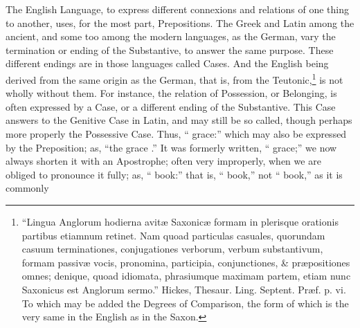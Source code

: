 The English Language, to express different connexions and relations of
one thing to another, uses, for the most part, Prepositions. The Greek
and Latin among the ancient, and some too among the modern languages, as
the German, vary the termination or ending of the Substantive, to answer
the same purpose. These different endings are in those languages called
Cases. And the English being derived from the same origin as the German,
that is, from the Teutonic,\footnote{``Lingua Anglorum hodierna
  avit\ae{} Saxonic\ae{} formam in plerisque orationis partibus etiamnum
  retinet. Nam quoad particulas casuales, quorundam casuum
  terminationes, conjugationes verborum, verbum substantivum, formam
  passiv\ae{} vocis, pronomina, participia, conjunctiones, \&
  pr\ae{}positiones omnes; denique, quoad idiomata, phrasiumque maximam
  partem, etiam nunc Saxonicus est Anglorum sermo.'' Hickes, Thesaur.
  Ling. Septent. Pr\ae{}f. p. vi. To which may be added the Degrees of
  Comparison, the form of which is the very same in the English as in
  the Saxon.} is not wholly without them. For instance, the relation of
Possession, or Belonging, is often expressed by a Case, or a different
ending of the Substantive. This Case answers to the Genitive Case in
Latin, and may still be so called, though perhaps more properly the
Possessive Case. Thus, `` grace:'' which may also be expressed
by the Preposition; as, ``the grace .'' It was formerly
written, `` grace;'' we now always shorten it with an
Apostrophe; often very improperly, when we are obliged to pronounce it
fully; as, `` book:'' that is, `` book,'' not
`` book,'' as it is commonly
